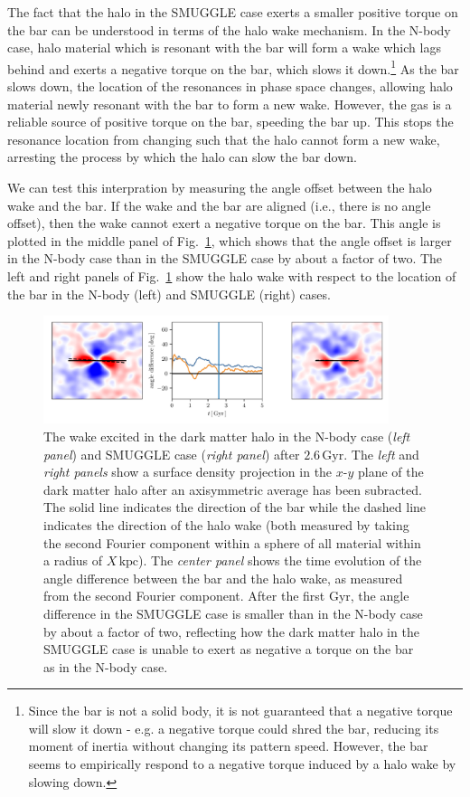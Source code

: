 \documentclass{natureprintstyle}
\begin{document}
The fact that the halo in the SMUGGLE case exerts a smaller positive torque on
the bar can be understood in terms of the halo wake mechanism. In the N-body
case, halo material which is resonant with the bar will form a wake which lags
behind and exerts a negative torque on the bar, which slows it
down.\cite{1984MNRAS.209..729T, 1985MNRAS.213..451W,
1992ApJ...400...80H}\footnote{Since the bar is not a solid body, it is not
guaranteed that a negative torque will slow it down - e.g. a negative torque
could shred the bar, reducing its moment of inertia without changing its
pattern speed. However, the bar seems to empirically respond to a negative
torque induced by a halo wake by slowing down.} As the bar slows down, the
location of the resonances in phase space changes, allowing halo material
newly resonant with the bar to form a new wake. However, the gas is a reliable
source of positive torque on the bar, speeding the bar up. This stops the
resonance location from changing such that the halo cannot form a new wake,
arresting the process by which the halo can slow the bar down.

We can test this interpration by measuring the angle offset between the halo
wake and the bar. If the wake and the bar are aligned (i.e., there is no angle
offset), then the wake cannot exert a negative torque on the bar. This angle
is plotted in the middle panel of Fig.~\ref{fig:wake}, which shows that the
angle offset is larger in the N-body case than in the SMUGGLE case by about a
factor of two. The left and right panels of Fig.~\ref{fig:wake} show the halo
wake with respect to the location of the bar in the N-body (left) and SMUGGLE
(right) cases.

\begin{figure}[h]%
\centering
\includegraphics[width=0.9\textwidth]{fig/fig3.pdf}
\caption{The wake excited in the dark matter halo in the N-body case
(\textit{left panel}) and SMUGGLE case (\textit{right panel}) after
$2.6\,\textrm{Gyr}$. The \textit{left} and \textit{right panels} show a
surface density projection in the $x$-$y$ plane of the dark matter halo after
an axisymmetric average has been subracted. The solid line indicates the
direction of the bar while the dashed line indicates the direction of the halo
wake (both measured by taking the second Fourier component within a sphere of
all material within a radius of $X\,\textrm{kpc}$). The \textit{center panel}
shows the time evolution of the angle difference between the bar and the halo
wake, as measured from the second Fourier component. After the first Gyr, the
angle difference in the SMUGGLE case is smaller than in the N-body case by
about a factor of two, reflecting how the dark matter halo in the SMUGGLE case
is unable to exert as negative a torque on the bar as in the N-body
case.}\label{fig:wake}
\end{figure}
\end{document}
